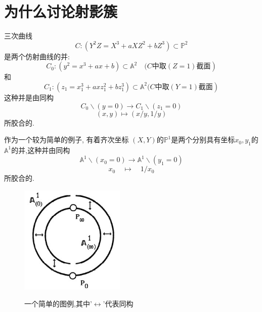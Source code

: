 \documentclass[UTF8]{book}
\begin{document}
	\section{为什么讨论射影簇}
		三次曲线
		\begin{equation*}
		C :\left( Y ^{2} Z = X ^{3}+ aXZ ^{2}+ bZ ^{3}\right) \subset \mathbb{P} ^{2}
		\end{equation*}
		是两个仿射曲线的并:
		\begin{equation*}
		\left. C _{0}:\left( y ^{2}= x ^{3}+ ax + b \right) \subset \mathbb{A} ^{2} \quad  (C \text{中取} (Z = 1) \text{截面}\right)
		\end{equation*}
		和
		\begin{equation*}
		\left. C _{1}:\left( z _{1}= x _{1}^{3}+ axz _{1}^{2}+ bz _{1}^{3}\right) \subset \mathbb{A} ^{2}   (C \text{中取} (Y = 1) \text{截面}\right)
		\end{equation*}
		这种并是由同构
		\begin{equation*}
		C _{0} \backslash( y =0) \longrightarrow  C _{1} \backslash\left( z _{1}=0\right)
		\end{equation*}
		\begin{equation*}
		( x , y ) \mapsto( x / y , 1 / y )
		\end{equation*}
		所胶合的.
		
		
		作为一个较为简单的例子, 有着齐次坐标 $( X , Y )$的$\mathbb{P}^{1}$是两个分别具有坐标$ x_{0},y_{1} $的 $\mathbb{A}^{1}$的并,这种并由同构
		\begin{equation*}
		\mathbb{A}^{1} \backslash\left(x_{0}=0\right)\rightarrow \mathbb{A}^{1} \backslash\left(y_{1}=0\right)
		\end{equation*}
		\begin{equation*}
		x _{0} \quad \mapsto \quad 1 / x _{0}
		\end{equation*}
		所胶合的.
		
		
		\begin{figure}[h]
			\centering
			\includegraphics[width=5cm]{50.jpg}\\
			\caption*{一个简单的图例,其中'$ \leftrightarrow $'代表同构}
		\end{figure}
	
\end{document}
